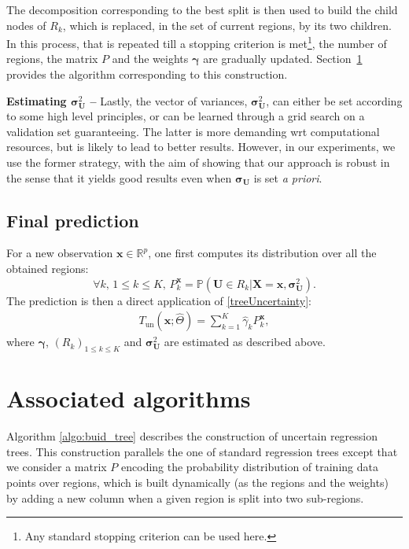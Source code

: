 The decomposition corresponding to the best split is then used to build the child nodes of $R_k$, which is replaced, in the set of current regions, by its two children. In this process, that is repeated till a stopping criterion is met\footnote{Any standard stopping criterion can be used here.}, the number of regions, the matrix $P$ and the weights $\boldsymbol{\gamma}$ are gradually updated. Section~\ref{sec:algo} provides the algorithm corresponding to this construction.

\noindent \textbf{Estimating $\boldsymbol{\sigma}_{\boldsymbol{U}}^2$ --} Lastly, the vector of variances, $\boldsymbol{\sigma}_{\boldsymbol{U}}^2$,
can either be set according to some high level principles, or can be learned through a grid search on a validation set guaranteeing. The latter is more demanding wrt computational resources, but is likely to lead to better results. However, in our experiments, we use the former strategy, with the aim of showing that our approach is robust in the sense that it yields good results even when $\boldsymbol{\sigma_U}$ is set \textit{a priori}.


\subsection{Final prediction}

For a new observation $\boldsymbol{x}\in \mathbb{R}^p$, one first computes its distribution over all the obtained regions:
%
$$ \forall k, \, 1\leq k \leq K, \, P^{\boldsymbol{x}}_k = \mathbb{P}\left(\boldsymbol{U} \in {R}_{k}| \boldsymbol{X} = \boldsymbol{x}, {\boldsymbol{\sigma}}_{\boldsymbol{U}}^2 \right) .$$
%
The prediction is then a direct application of \eqref{treeUncertainty}:
%
\begin{align}
    T_{\text{un}}\left(\boldsymbol{x}; \hat{\Theta}\right) = \sum_{k=1}^K \hat{\gamma}_k P^{\boldsymbol{x}}_k,
  \label{pred:untree}
\end{align}
%
where $\boldsymbol{\gamma}$, $(R_k)_{1 \le k \le K}$ and $\boldsymbol{\sigma}_{\boldsymbol{U}}^2$ are estimated as described above.
%

\section{Associated algorithms}
\label{sec:algo}

Algorithm \ref{algo:buid_tree} describes the construction of uncertain regression trees. This construction parallels the one of standard regression trees except that we consider a matrix $P$ encoding the probability distribution of training data points over regions, which is built dynamically (as the regions and the weights) by adding a new column when a given region is split into two sub-regions.

